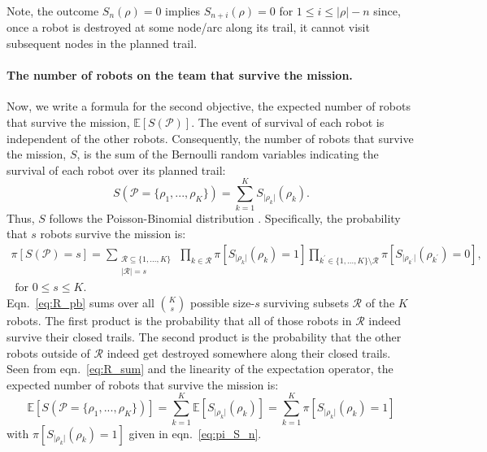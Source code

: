 \documentclass[11pt, oneside]{article}
\begin{document}
Note, the outcome $S_n(\rho)=0$ implies $S_{n+i}(\rho)=0$ for $1 \leq i \leq \lvert \rho \rvert-n$ since, once a robot is destroyed at some node/arc along its trail, it cannot visit subsequent nodes in the planned trail.

\paragraph{The number of robots on the team that survive the mission.} 
Now, we write a formula for the second objective, the expected number of robots that survive the mission, $\mathbb{E}[S(\mathcal{P})]$.
The event of survival of each robot is independent of the other robots.
Consequently, the number of robots that survive the mission, $S$, is the sum of the Bernoulli random variables indicating the survival of each robot over its planned trail:
\begin{equation}
	S(\mathcal{P}=\{\rho_1, ..., \rho_K\})=\sum_{k=1}^K S_{\lvert \rho_k \rvert}(\rho_k). \label{eq:R_sum}
\end{equation}
Thus, $S$ follows the Poisson-Binomial distribution \cite{tang2023poisson}.
Specifically, the probability that $s$ robots survive the mission is:
\begin{multline}
	\pi[S(\mathcal{P})=s] = \sum_{\substack{\mathcal{R} \subseteq \{1, ..., K\}  \\ \lvert \mathcal{R} \rvert = s} } \,
	\prod_{k \in \mathcal{R}} \pi[S_{\lvert \rho_k \rvert}(\rho_k) = 1]
	\prod_{k^\prime \in \{1, ..., K\} \setminus \mathcal{R}}
	 \pi[S_{\lvert \rho_{k^\prime} \rvert}(\rho_{k^\prime}) = 0]
	 , \\ \text{ for } 0 \leq s \leq K.
	\label{eq:R_pb}
\end{multline}
Eqn.~\ref{eq:R_pb} sums over all $\binom{K}{s}$ possible size-$s$ surviving subsets $\mathcal{R}$ of the $K$ robots. The first product is the probability that all of those robots in $\mathcal{R}$ indeed survive their closed trails. The second product is the probability that the other robots outside of $\mathcal{R}$ indeed get destroyed somewhere along their closed trails.
Seen from eqn.~\ref{eq:R_sum} and the linearity of the expectation operator, the expected number of robots that survive the mission is:
\begin{equation}
	\mathbb{E}[S(\mathcal{P}=\{\rho_1, ..., \rho_K\})]=\sum_{k=1}^K \mathbb{E}[S_{\lvert \rho_k \rvert}(\rho_k)] = \sum_{k=1}^K  \pi[S_{\lvert \rho_k \rvert}(\rho_k) = 1] \label{eq:formula_obj2}
\end{equation} with $\pi[S_{\lvert \rho_k \rvert}(\rho_k) = 1]$ given in eqn.~\ref{eq:pi_S_n}.
\end{document}
